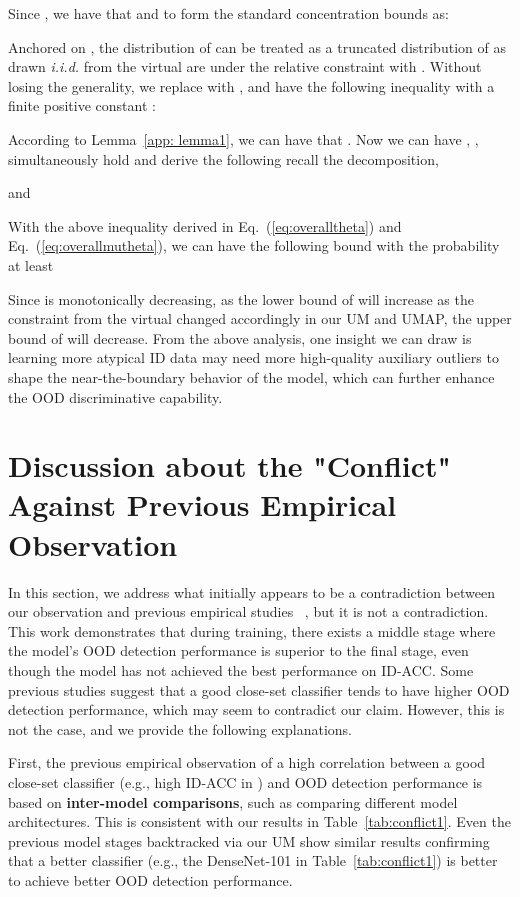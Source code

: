 \documentclass{article}
\theoremstyle{plain}
\theoremstyle{definition}
\theoremstyle{remark}
\begin{document}
Since , we have that  and  to form the standard concentration bounds as:


Anchored on , the distribution of  can be treated as a truncated distribution of  as  drawn \textit{i.i.d.} from the virtual  are under the relative constraint with . Without losing the generality, we replace  with , and have the following inequality with a finite positive constant :

According to Lemma~\ref{app: lemma1}, we can have that . Now we can have , ,  simultaneously hold and derive the following recall the decomposition,

and

With the above inequality derived in Eq.~(\ref{eq:overalltheta}) and Eq.~(\ref{eq:overallmutheta}), we can have the following bound with the probability at least 

Since  is monotonically decreasing, as the lower bound of  will increase as the constraint from the virtual  changed accordingly in our UM and UMAP, the upper bound of  will decrease.
From the above analysis, one insight we can draw is learning more atypical ID data may need more high-quality auxiliary outliers to shape the near-the-boundary behavior of the model, which can further enhance the OOD discriminative capability.

\section{Discussion about the "Conflict" Against Previous Empirical Observation}
\label{app:conflict}

In this section, we address what initially appears to be a contradiction between our observation and previous empirical studies~ \citep{vaze2022openset,fort2021exploring}, but it is not a contradiction. This work demonstrates that during training, there exists a middle stage where the model's OOD detection performance is superior to the final stage, even though the model has not achieved the best performance on ID-ACC. Some previous studies \citep{vaze2022openset,fort2021exploring} suggest that a good close-set classifier tends to have higher OOD detection performance, which may seem to contradict our claim. However, this is not the case, and we provide the following explanations.

First, the previous empirical observation \citep{vaze2022openset,fort2021exploring} of a high correlation between a good close-set classifier (e.g., high ID-ACC in \citep{vaze2022openset}) and OOD detection performance is based on \textbf{inter-model comparisons}, such as comparing different model architectures. This is consistent with our results in Table~\ref{tab:conflict1}. Even the previous model stages backtracked via our UM show similar results confirming that a better classifier (e.g., the DenseNet-101 in Table~\ref{tab:conflict1}) is better to achieve better OOD detection performance.
\end{document}
